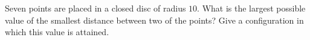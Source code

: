 Seven points are placed in a closed disc of radius $10$. What is the largest possible value of the smallest distance between two of the points? Give a configuration in which this value is attained.
